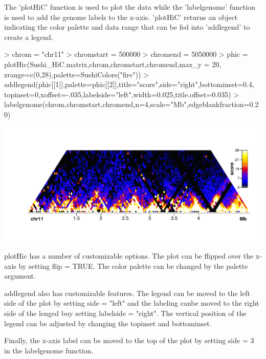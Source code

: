 \documentclass{article}
\begin{document}
The 'plotHiC' function is used to plot the data while the 'labelgenome' function is used to add the genome labels to the x-axis.  'plotHiC' returns an object indicating the color palette and data range that can be fed into 'addlegend' to create a legend.

\begin{center}

\begin{Schunk}
\begin{Sinput}
> chrom            = "chr11"
> chromstart       = 500000
> chromend         = 5050000
> phic = plotHic(Sushi_HiC.matrix,chrom,chromstart,chromend,max_y = 20,
                zrange=c(0,28),palette=SushiColors("fire"))
> addlegend(phic[[1]],palette=phic[[2]],title="score",side="right",bottominset=0.4,
           topinset=0,xoffset=-.035,labelside="left",width=0.025,title.offset=0.035)
> labelgenome(chrom,chromstart,chromend,n=4,scale="Mb",edgeblankfraction=0.20)
\end{Sinput}
\end{Schunk}
\includegraphics{Sushi-019}
\end{center}

plotHic has a number of customizable options.  The plot can be flipped over the x-axis by setting flip = TRUE.  The color palette can be changed by the palette argument. 

addlegend also has customizable features.  The legend can be moved to the left side of the plot by setting side = "left" and the labeling canbe moved to the right side of the lenged buy setting labelside = "right".  The vertical position of the legend can be adjusted by changing the topinset and bottominset.

Finally, the x-axis label can be moved to the top of the plot by setting side = 3 in the labelgenome function.
\end{document}
